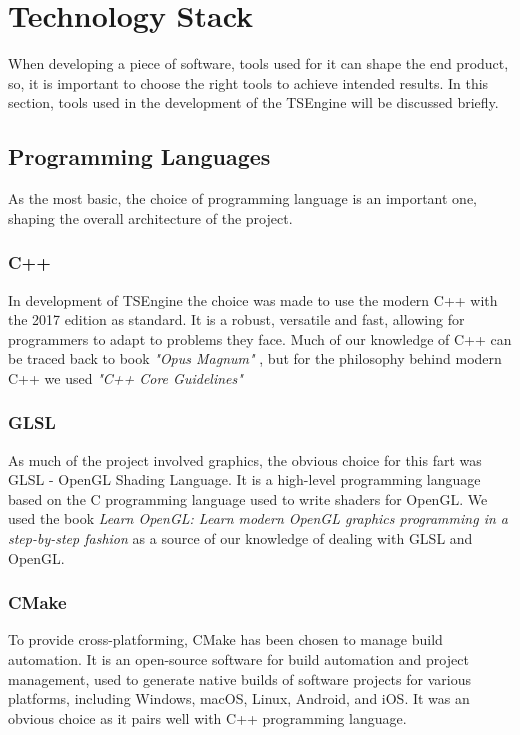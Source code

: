 \newpage
\section{Technology Stack}
\hspace{\parindent}
When developing a piece of software, tools used for it can shape the end product, so, it is important to choose the right tools to achieve intended results. In this section, tools used in the development of the TSEngine will be discussed briefly.

\subsection{Programming Languages}
\hspace{\parindent}
As the most basic, the choice of programming language is an important one, shaping the overall architecture of the project.
\subsubsection{C++}
\hspace{\parindent}
In development of TSEngine the choice was made to use the modern C++ with the 2017 edition as standard. It is a robust, versatile and fast, allowing for programmers to adapt to problems they face. Much of our knowledge of C++ can be traced back to book \textit{"Opus Magnum"} \cite{OpusMagnum}, but for the philosophy behind modern C++ we used \textit{"C++ Core Guidelines"} \cite{CppCoreGuidelines}
\subsubsection{GLSL}
\hspace{\parindent}
\label{sec:glsl}
As much of the project involved graphics, the obvious choice for this fart was GLSL - OpenGL Shading Language. It is a high-level programming language based on the C programming language used to write shaders for OpenGL. We used the book \textit{Learn OpenGL: Learn modern OpenGL graphics programming in a step-by-step fashion} \cite{learnopengl} as a source of our knowledge of dealing with GLSL and OpenGL.

\subsubsection{CMake}
\hspace{\parindent}
\label{sec:stack_cmake}
To provide cross-platforming, CMake has been chosen to manage build automation. It is an open-source software for build automation and project management, used to generate native builds of software projects for various platforms, including Windows, macOS, Linux, Android, and iOS. It was an obvious choice as it pairs well with C++ programming language.

